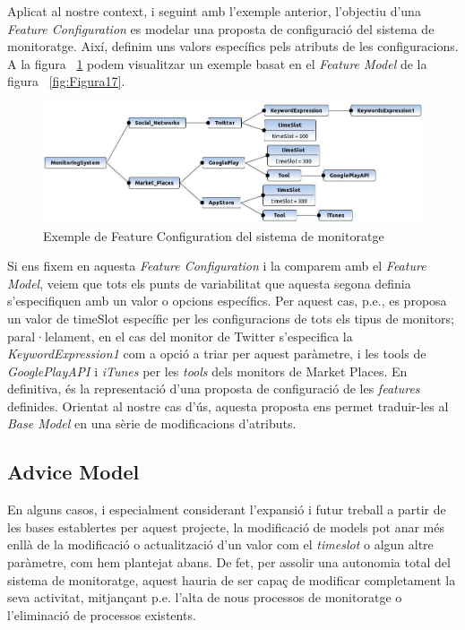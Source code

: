 Aplicat al nostre context, i seguint amb l'exemple anterior, l'objectiu d'una \textit{Feature Configuration} es modelar una proposta de configuració del sistema de monitoratge. Així, definim uns valors específics pels atributs de les configuracions. A la figura ~\ref{fig:Figura18} podem visualitzar un exemple basat en el \textit{Feature Model} de la figura ~\ref{fig:Figura17}.\\

\begin{figure}
\centering
\includegraphics[width=13cm]{Figures/Figure18}
\decoRule
\caption{Exemple de Feature Configuration del sistema de monitoratge}
\label{fig:Figura18}
\end{figure}

Si ens fixem en aquesta \textit{Feature Configuration} i la comparem amb el \textit{Feature Model}, veiem que tots els punts de variabilitat que aquesta segona definia s'especifiquen amb un valor o opcions específics. Per aquest cas, p.e., es proposa un valor de timeSlot específic per les configuracions de tots els tipus de monitors; paral·lelament, en el cas del monitor de Twitter s'especifica la \textit{KeywordExpression1} com a opció a triar per aquest paràmetre, i les tools de \textit{GooglePlayAPI} i \textit{iTunes} per les \textit{tools} dels monitors de Market Places. En definitiva, és la representació d'una proposta de configuració de les \textit{features} definides. Orientat al nostre cas d'ús, aquesta proposta ens permet traduir-les al \textit{Base Model} en una sèrie de modificacions d'atributs.\\

\subsection{Advice Model}

En alguns casos, i especialment considerant l'expansió i futur treball a partir de les bases establertes per aquest projecte, la modificació de models pot anar més enllà de la modificació o actualització d'un valor com el \textit{timeslot} o algun altre paràmetre, com hem plantejat abans. De fet, per assolir una autonomia total del sistema de monitoratge, aquest hauria de ser capaç de modificar completament la seva activitat, mitjançant p.e. l'alta de nous processos de monitoratge o l'eliminació de processos existents.\\

